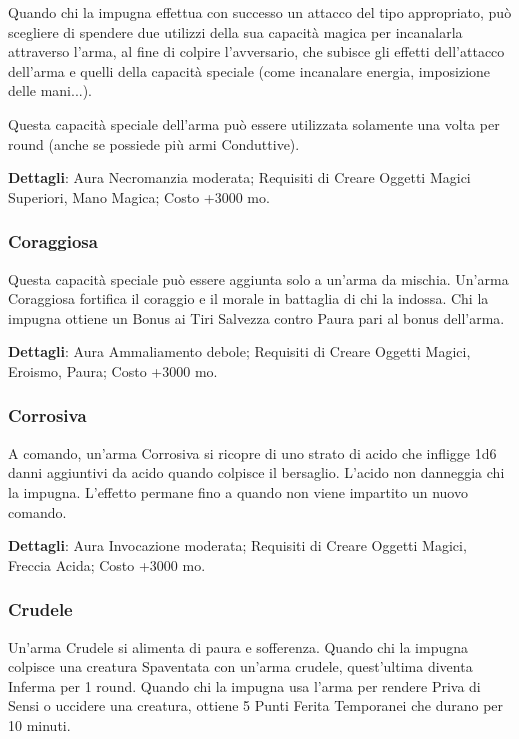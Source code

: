 \begin{multicols}{2}
	Quando chi la impugna effettua con successo un attacco del tipo appropriato, può scegliere di spendere due utilizzi della sua capacità magica per incanalarla attraverso l'arma, al fine di colpire l'avversario, che subisce gli effetti dell'attacco dell'arma e quelli della capacità speciale (come incanalare energia, imposizione delle mani...).

	Questa capacità speciale dell'arma può essere utilizzata solamente una volta per round (anche se possiede più armi Conduttive).

	\textbf{Dettagli}: Aura Necromanzia moderata; Requisiti di Creare Oggetti Magici Superiori, Mano Magica; Costo +3000 mo.

	\subsubsection*{Coraggiosa}

	Questa capacità speciale può essere aggiunta solo a un'arma da mischia. Un'arma Coraggiosa fortifica il coraggio e il morale in battaglia di chi la indossa. Chi la impugna ottiene un Bonus ai Tiri Salvezza contro Paura pari al bonus dell'arma.

	\textbf{Dettagli}: Aura Ammaliamento debole; Requisiti di Creare Oggetti Magici, Eroismo, Paura; Costo +3000 mo.

	\subsubsection*{Corrosiva}

	A comando, un'arma Corrosiva si ricopre di uno strato di acido che infligge 1d6 danni aggiuntivi da acido quando colpisce il bersaglio. L'acido non danneggia chi la impugna. L'effetto permane fino a quando non viene impartito un nuovo comando.

	\textbf{Dettagli}: Aura Invocazione moderata; Requisiti di Creare Oggetti Magici, Freccia Acida; Costo +3000 mo.

	\subsubsection*{Crudele}

	Un'arma Crudele si alimenta di paura e sofferenza. Quando chi la impugna colpisce una creatura Spaventata con un'arma crudele, quest'ultima diventa Inferma per 1 round. Quando chi la impugna usa l'arma per rendere Priva di Sensi o uccidere una creatura, ottiene 5 Punti Ferita Temporanei che durano per 10 minuti.


\end{multicols}
